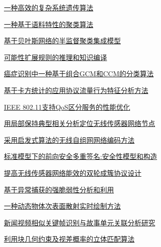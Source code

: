 \documentclass[a4paper]{article}
\begin{document}
\href{http://www.jos.org.cn/ch/reader/download_pdf.aspx?file_no=3673&year_id=2010&quarter_id=11&falg=1}{一种高效的复杂系统遗传算法}

\href{http://www.jos.org.cn/ch/reader/download_pdf.aspx?file_no=3677&year_id=2010&quarter_id=11&falg=1}{一种基于语料特性的聚类算法}

\href{http://www.jos.org.cn/ch/reader/download_pdf.aspx?file_no=3683&year_id=2010&quarter_id=11&falg=1}{基于贝叶斯网络的半监督聚类集成模型}

\href{http://www.jos.org.cn/ch/reader/download_pdf.aspx?file_no=3690&year_id=2010&quarter_id=11&falg=1}{可能性扩展规则的推理和知识编译}

\href{http://www.jos.org.cn/ch/reader/download_pdf.aspx?file_no=3699&year_id=2010&quarter_id=11&falg=1}{癌症识别中一种基于组合GCM和CCM的分类算法}

\href{http://www.jos.org.cn/ch/reader/download_pdf.aspx?file_no=3747&year_id=2010&quarter_id=11&falg=1}{基于卡方统计的应用协议流量行为特征分析方法}

\href{http://www.jos.org.cn/ch/reader/download_pdf.aspx?file_no=3682&year_id=2010&quarter_id=11&falg=1}{IEEE 802.11支持QoS区分服务的性能优化}

\href{http://www.jos.org.cn/ch/reader/download_pdf.aspx?file_no=3686&year_id=2010&quarter_id=11&falg=1}{用局部保持典型相关分析定位无线传感器网络节点}

\href{http://www.jos.org.cn/ch/reader/download_pdf.aspx?file_no=3640&year_id=2010&quarter_id=11&falg=1}{采用启发式算法的无线自组网网络编码方法}

\href{http://www.jos.org.cn/ch/reader/download_pdf.aspx?file_no=3834&year_id=2010&quarter_id=11&falg=1}{标准模型下的前向安全多重签名:安全性模型和构造}

\href{http://www.jos.org.cn/ch/reader/download_pdf.aspx?file_no=3668&year_id=2010&quarter_id=11&falg=1}{提高无线传感器网络能效的双轮成簇协议设计}

\href{http://www.jos.org.cn/ch/reader/download_pdf.aspx?file_no=3672&year_id=2010&quarter_id=11&falg=1}{基于异常捕获的强脆弱性分析和利用}

\href{http://www.jos.org.cn/ch/reader/download_pdf.aspx?file_no=3697&year_id=2010&quarter_id=11&falg=1}{一种动态物体次表面散射实时绘制方法}

\href{http://www.jos.org.cn/ch/reader/download_pdf.aspx?file_no=3655&year_id=2010&quarter_id=11&falg=1}{新闻视频相似关键帧识别与故事单元关联分析研究}

\href{http://www.jos.org.cn/ch/reader/download_pdf.aspx?file_no=3695&year_id=2010&quarter_id=11&falg=1}{利用块几何约束及视差概率的立体匹配算法}
\end{document}
